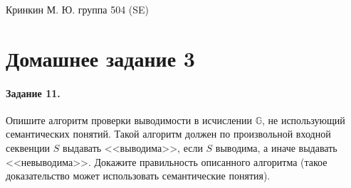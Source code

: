 \documentclass[a4paper,12pt]{article}
\begin{document}
\sloppy

\lstset{
	basicstyle=\small,
	stringstyle=\ttfamily,
	showstringspaces=false,
	columns=fixed,
	breaklines=true,
	numbers=right,
	numberstyle=\tiny
}

\newtheorem{Def}{Определение}[section]
\newtheorem{Th}{Теорема}
\newtheorem{Lem}[Th]{Лемма}
\newenvironment{Proof}
	{\par\noindent{\bf Доказательство.}}
	{\hfill$\scriptstyle\blacksquare$}
\newenvironment{Solution}
	{\par\noindent{\bf Решение.}}
	{\hfill$\scriptstyle\blacksquare$}


\begin{flushright}
	Кринкин М. Ю. группа 504 (SE)
\end{flushright}

\section{Домашнее задание 3}

\paragraph{Задание 11.} Опишите алгоритм проверки выводимости в исчислении $\mathbb{G}$, не использующий семантических понятий. Такой алгоритм должен по произвольной входной секвенции $S$ выдавать <<выводима>>, если $S$ выводима, а иначе выдавать <<невыводима>>. Докажите правильность описанного алгоритма (такое доказательство может использовать семантические понятия).
\end{document}
